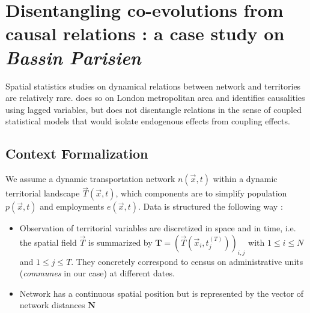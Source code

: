 \newpage

\section[Disentangling co-evolutions from causal relations]{Disentangling co-evolutions from causal relations : a case study on \emph{Bassin Parisien}}

Spatial statistics studies on dynamical relations between network and territories are relatively rare. \cite{levinson2008density} does so on London metropolitan area and identifies causalities using lagged variables, but does not disentangle relations in the sense of coupled statistical models that would isolate endogenous effects from coupling effects.




\subsection{Context Formalization}



We assume a dynamic transportation network $n(\vec{x},t)$ within a dynamic territorial landscape $\vec{T}(\vec{x},t)$, which components are to simplify population $p(\vec{x},t)$ and employments $e(\vec{x},t)$. Data is structured the following way :
\begin{itemize}
\item Observation of territorial variables are discretized in space and in time, i.e. the spatial field $\vec{T}$ is summarized by $\mathbf{T} = \left(\vec{T}(\vec{x}_i,t_j^{(T)})\right)_{i,j}$ with $1\leq i \leq N$ and $1\leq j \leq T$. They concretely correspond to census on administrative units (\emph{communes} in our case) at different dates.
\item Network has a continuous spatial position but is represented by the vector of network distances $\mathbf{N}$
\end{itemize}



